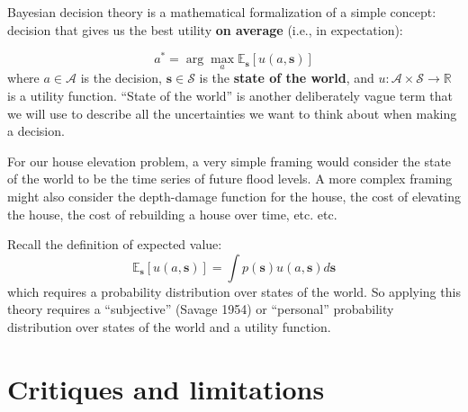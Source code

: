 \documentclass[
  letterpaper,
  DIV=11,
  numbers=noendperiod]{scrreprt}
\begin{document}
Bayesian decision theory is a mathematical formalization of a simple
concept: decision that gives us the best utility \textbf{on average}
(i.e., in expectation):

\[
a^* = \arg \max_a \mathbb{E}_\mathbf{s} \left[ u(a, \mathbf{s}) \right]
\] where \(a \in \mathcal{A}\) is the decision,
\(\mathbf{s} \in \mathcal{S}\) is the \textbf{state of the world}, and
\(u: \mathcal{A} \times \mathcal{S} \to \mathbb{R}\) is a utility
function. ``State of the world'' is another deliberately vague term that
we will use to describe all the uncertainties we want to think about
when making a decision.

\begin{tcolorbox}[enhanced jigsaw, arc=.35mm, breakable, title=\textcolor{quarto-callout-tip-color}{\faLightbulb}\hspace{0.5em}{Tip}, coltitle=black, opacityback=0, bottomtitle=1mm, colback=white, left=2mm, opacitybacktitle=0.6, toptitle=1mm, colframe=quarto-callout-tip-color-frame, leftrule=.75mm, titlerule=0mm, rightrule=.15mm, bottomrule=.15mm, colbacktitle=quarto-callout-tip-color!10!white, toprule=.15mm]

For our house elevation problem, a very simple framing would consider
the state of the world to be the time series of future flood levels. A
more complex framing might also consider the depth-damage function for
the house, the cost of elevating the house, the cost of rebuilding a
house over time, etc. etc.

\end{tcolorbox}

Recall the definition of expected value: \[
\mathbb{E}_\mathbf{s} \left[ u(a, \mathbf{s}) \right] = \int p(\mathbf{s}) u(a, \mathbf{s}) d\mathbf{s}
\] which requires a probability distribution over states of the world.
So applying this theory requires a ``subjective'' (Savage 1954) or
``personal'' probability distribution over states of the world and a
utility function.

\section{Critiques and limitations}\label{critiques-and-limitations}
\end{document}
